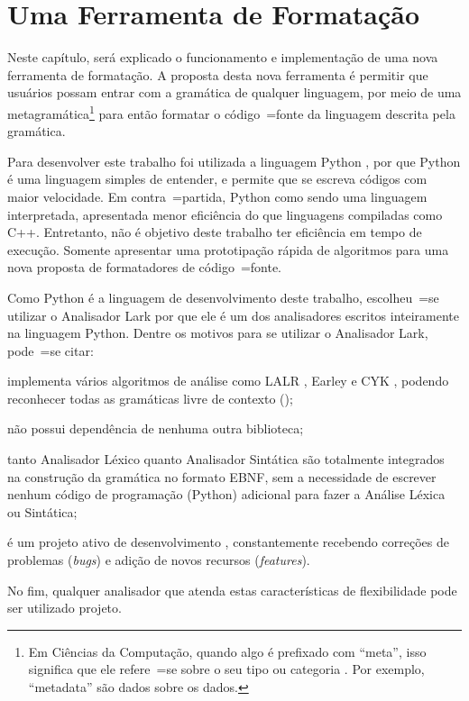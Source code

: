 

\chapter{Uma Ferramenta de Formatação}
\label{software_implementation}

Neste capítulo,
será explicado o funcionamento e
implementação de uma nova ferramenta de formatação.
A proposta desta nova ferramenta é permitir que usuários possam entrar com a gramática de qualquer linguagem,
por meio de uma metagramática\footnote{
Em Ciências da Computação,
quando algo é prefixado com ``meta'',
isso significa que ele refere~=se sobre o seu tipo ou
categoria \cite{theUseOfMetaRules}.
Por exemplo,
``metadata'' são dados sobre os dados.
} para então formatar o código~=fonte da linguagem descrita pela gramática.

Para desenvolver este trabalho foi utilizada a linguagem Python \cite{webDevelopmentWithDjango},
por que Python é uma linguagem simples de entender,
e permite que se escreva códigos com maior velocidade.
Em contra~=partida,
Python como sendo uma linguagem interpretada,
apresentada menor eficiência do que linguagens compiladas como C++.
Entretanto,
não é objetivo deste trabalho ter eficiência em tempo de execução.
Somente apresentar uma prototipação rápida de algoritmos para uma nova proposta de formatadores de código~=fonte.

Como Python é a linguagem de desenvolvimento deste trabalho,
escolheu~=se utilizar o Analisador Lark por que ele é um dos analisadores escritos inteiramente na linguagem Python.
Dentre os motivos para se utilizar o Analisador Lark,
pode~=se citar:
\begin{inparaenum}[1)]
\item implementa vários algoritmos de análise como LALR \cite{lalrDeRemer1982},
Earley \cite{JayEarley} e CYK \cite{hopcroftBook},
podendo reconhecer todas as gramáticas livre de contexto ();
\item não possui dependência de nenhuma outra biblioteca;
\item tanto Analisador Léxico quanto Analisador Sintática são totalmente integrados na construção da gramática no formato EBNF,
sem a necessidade de escrever nenhum código de programação (Python) adicional para fazer a Análise Léxica ou
Sintática;
\item é um projeto ativo de desenvolvimento \cite{larkCommitHistory},
constantemente recebendo correções de problemas (\textit{bugs}) e
adição de novos recursos (\textit{features}).
\end{inparaenum}%
No fim,
qualquer analisador que atenda estas características de flexibilidade pode ser utilizado projeto.

